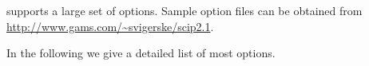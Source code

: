 \SCIP supports a large set of options.
Sample option files can be obtained from \\ \url{http://www.gams.com/~svigerske/scip2.1}.


In the following we give a detailed list of most \SCIP options.



%
%
%
%
%
%
%
%
%
%
%
%
%
%
%
%
%
